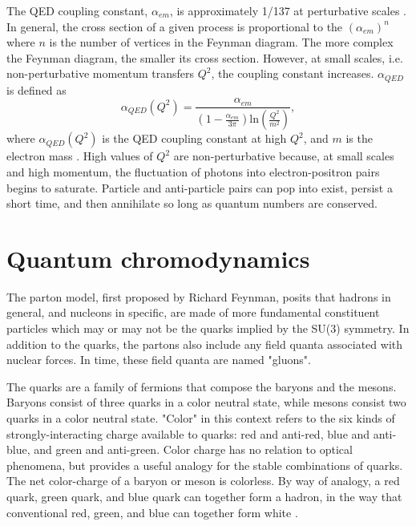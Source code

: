 The QED coupling constant, $\alpha_{em}$, is approximately 1/137 at perturbative scales \cite{Bouchendira:2010es}. In general, the cross section of a given process is proportional to the $(\alpha_{em})^n$ where $n$ is the number of vertices in the Feynman diagram. The more complex the Feynman diagram, the smaller its cross section. However, at small scales, i.e. non-perturbative momentum transfers $Q^2$, the coupling constant increases. $\alpha_{QED}$ is defined as
\begin{equation}
\alpha_{QED}(Q^2) = \frac{ \alpha_{em}}{(1 - \frac{\alpha_{em}}{3\pi})\mathrm{ln}(\frac{Q^2}{m^2}) },
\end{equation}
where $\alpha_{QED}(Q^2)$ is the QED coupling constant at high $Q^2$, and $m$ is the electron mass \cite{Abbiendi:2005rx}. High values of $Q^2$ are non-perturbative because, at small scales and high momentum, the fluctuation of photons into electron-positron pairs begins to saturate. Particle and anti-particle pairs can pop into exist, persist a short time, and then annihilate so long as quantum numbers are conserved. 

\section{Quantum chromodynamics}

The parton model, first proposed by Richard Feynman, posits that hadrons in general, and nucleons in specific, are made of more fundamental constituent particles which may or may not be the quarks implied by the SU(3) symmetry. In addition to the quarks, the partons also include any field quanta associated with nuclear forces. In time, these field quanta are named "gluons".

The quarks are a family of fermions that compose the baryons and the mesons. Baryons consist of three quarks in a color neutral state, while mesons consist two quarks in a color neutral state. "Color" in this context refers to the six kinds of strongly-interacting charge available to quarks: red and anti-red, blue and anti-blue, and green and anti-green. Color charge has no relation to optical phenomena, but provides a useful analogy for the stable combinations of quarks. The net color-charge of a baryon or meson is colorless. By way of analogy, a red quark, green quark, and blue quark can together form a hadron, in the way that conventional red, green, and blue can together form white \cite{Brock:1993sz}. 

